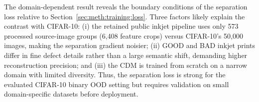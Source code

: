 The domain-dependent result reveals the boundary conditions of the
separation loss relative to Section~\ref{sec:meth:training:loss}. Three
factors likely explain the contrast with CIFAR-10: (i) the retained
public inkjet pipeline uses only 573 processed source-image groups
(6,408 feature crops) versus CIFAR-10's 50,000 images, making the
separation gradient noisier; (ii) GOOD and BAD inkjet prints differ in
fine defect details rather than a large semantic shift, demanding higher
reconstruction precision; and (iii) the CDM is trained from scratch on a
narrow domain with limited diversity.
Thus, the separation loss is strong for the evaluated CIFAR-10 binary
OOD setting but requires validation on small domain-specific datasets
before deployment.
\endgroup
\endgroup
